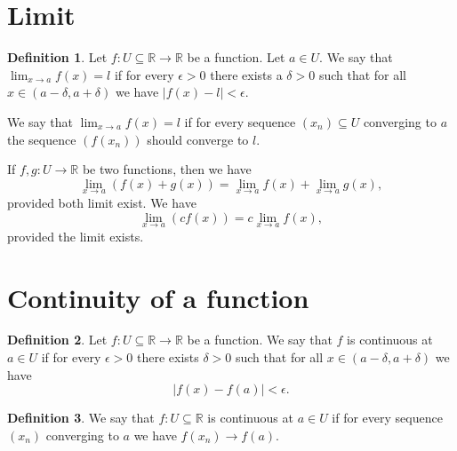 \documentclass{article}
\theoremstyle{definition}
\newtheorem{definition}{Definition}
\begin{document}
    \section{Limit}
    \begin{definition}
        Let $f:U\subseteq \mathbb{R} \to  \mathbb{R} $ be a function. Let $a\in U$. We say that $\displaystyle \lim_{x\to a}f(x)=l$ if for every $\epsilon >0$ there exists a $\delta >0$ such that for all $x\in \left( a-\delta  ,a+\delta   \right) $ we have $\left\vert f(x)-l\right\vert < \epsilon $.  
    \end{definition}
    
    We say that $\displaystyle \lim_{x \to a} f(x) = l$ if for every sequence $\left( x_n \right)\subseteq U $ converging to $a$ the sequence $\left( f\left( x_n \right)  \right) $ should converge to $l$.  

    If $f,g:U\to \mathbb{R} $ be two functions, then we have 
    \[
        \lim_{x \to a} (f(x)+g(x)) = \lim_{x \to a} f(x) + \lim_{x \to a} g(x),
    \] 
    provided both limit exist.
    We have 
    \[
        \lim_{x \to a} (cf(x)) = c \lim_{x \to a} f(x),
    \]
    provided the limit exists.

    \section{Continuity of a function}
    \begin{definition}
        Let $f:U\subseteq \mathbb{R} \to \mathbb{R} $ be a function. We say that $f$ is continuous at $a\in U$ if for every $\epsilon >0$ there exists $\delta >0$ such that for all $x\in \left( a-\delta ,a+\delta  \right) $ we have
        \[
            \left\vert f(x)-f(a) \right\vert < \epsilon.
        \]
    \end{definition}

    \begin{definition}
        We say that $f:U\subseteq \mathbb{R} $ is continuous at $a\in U$ if for every sequence $\left( x_n \right) $ converging to $a$ we have $f\left( x_n \right) \to f(a)$.
    \end{definition}
\end{document}
